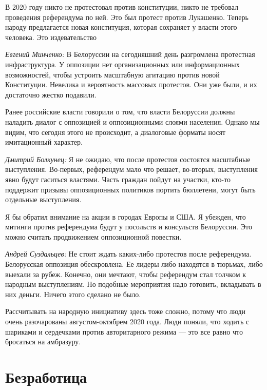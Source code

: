 \begin{fancyquotes}
    В 2020 году никто не протестовал против конституции, никто не требовал проведения референдума по ней. Это был протест против Лукашенко. Теперь народу предлагается новая конституция, которая сохраняет у власти этого человека. Это издевательство
\end{fancyquotes}

\textit{Евгений Минченко:} В Белоруссии на сегодняшний день разгромлена протестная инфраструктура. У оппозиции нет организационных или информационных возможностей, чтобы устроить масштабную агитацию против новой Конституции. Невелика и вероятность массовых протестов. Они уже были, и их достаточно жестко подавили.

Ранее российские власти говорили о том, что власти Белоруссии должны наладить диалог с оппозицией и оппозиционными слоями населения. Однако мы видим, что сегодня этого не происходит, а диалоговые форматы носят имитационный характер.

\textit{Дмитрий Болкунец:} Я не ожидаю, что после протестов состоятся масштабные выступления. Во-первых, референдум мало что решает, во-вторых, выступления явно будут гаситься властями. Часть граждан пойдут на участки, кто-то поддержит призывы оппозиционных политиков портить бюллетени, могут быть отдельные выступления.

Я бы обратил внимание на акции в городах Европы и США. Я убежден, что митинги против референдума будут у посольств и консульств Белоруссии. Это можно считать продвижением оппозиционной повестки.

\textit{Андрей Суздальцев:} Не стоит ждать каких-либо протестов после референдума. Белорусская оппозиция обескровлена. Ее лидеры либо находятся в тюрьмах, либо выехали за рубеж. Конечно, они мечтают, чтобы референдум стал толчком к народным выступлениям. Но подобные мероприятия надо готовить, вкладывать в них деньги. Ничего этого сделано не было.

Рассчитывать на народную инициативу здесь тоже сложно, потому что люди очень разочарованы августом-октябрем 2020 года. Люди поняли, что ходить с шариками и сердечками против авторитарного режима — это все равно что бросаться на амбразуру.

\clearpage


\section{Безработица}

